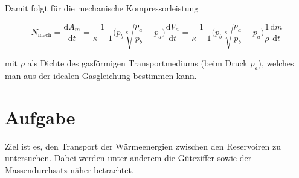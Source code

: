 Damit folgt für die mechanische Kompressorleistung


\begin{equation}
\label{eqn:mechleistung}
N_\text{mech} = \frac{\mathrm{d}A_m}{\mathrm{d}t} = \frac{1}{\kappa -1}\biggl(p_b \sqrt[\kappa]{\frac{p_a}{p_b}}-p_a\biggr)\frac{\mathrm{d}V_a}{\mathrm{d}t} = \frac{1}{\kappa-1}\biggl(p_b \sqrt[\kappa]{\frac{p_a}{p_b}}-p_a\biggr)\frac{1}{\rho} \frac{\mathrm{d}m} {\mathrm{d}t}
\end{equation}

mit $\rho$ als Dichte des gasförmigen Transportmediums (beim Druck $p_a$), welches man aus der idealen Gasgleichung bestimmen kann.

\section{Aufgabe}
\label{sec:Aufgabe}
Ziel ist es, den Transport der Wärmeenergien zwischen den Reservoiren zu untersuchen. Dabei werden unter anderem die Güteziffer sowie der Massendurchsatz näher betrachtet.
